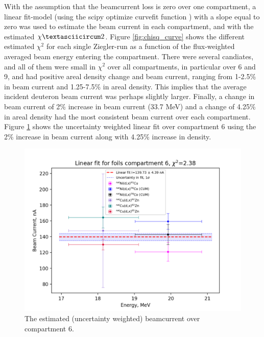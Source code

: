 With the assumption that the beamcurrent loss is zero over one compartment, a linear fit-model (using the scipy optimize curvefit function \cite{Virtanen2020}) with a slope equal to zero was used to estimate the beam current in each compartment, and with the estimated $\chiˆ2$. Figure \ref{fig:chisq_curve} shows the different estimated $\chi^2$ for each single Ziegler-run as a function of the flux-weighted averaged beam energy entering the compartment. There were several candiates, and all of them were small in $\chi^2$ over all compartments, in particular over 6 and 9, and had positive areal density change and beam current, ranging from 1-2.5\% in beam current and 1.25-7.5\% in areal density. This implies that the average incident deuteron beam current was perhaps slightly larger. Finally, a change in beam current of 2\% increase in beam current (33.7 MeV) and a change of 4.25\% in areal density had the most consistent beam current over each compartment. Figure \ref{fig:BC_comp6} shows the uncertainty weighted linear fit over compartment 6 using the 2\% increase in beam current along with 4.25\% increase in density.  \\

\begin{figure}
    \centering
    \includegraphics{Analysis/Compartment_6.png}
    \caption{The estimated (uncertainty weighted) beamcurrent over compartment 6.  }
    \label{fig:BC_comp6}
\end{figure}

